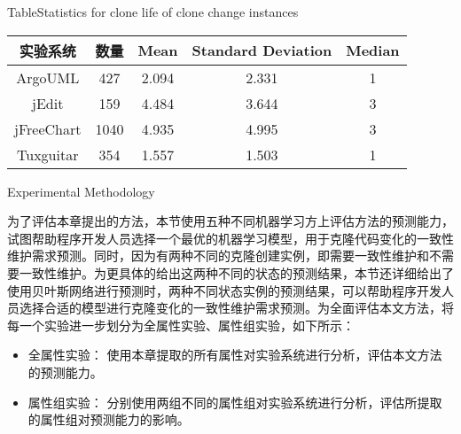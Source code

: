 \begin{table}[htbp]
{Table$\!$}{Statistics for clone life of clone change instances}
\vspace{0.5em}
\centering
\wuhao
\begin{tabular}{ccccc}
\toprule[1.5pt]
{实验系统}&{数量}&{Mean}&{Standard Deviation}&{Median}\\ 
\midrule[1pt]
ArgoUML&427&2.094&2.331&1\\ 
jEdit&159&4.484&3.644&3\\ 
jFreeChart&1040&4.935&4.995&3\\ 
Tuxguitar&354&1.557&1.503&1\\ 
\bottomrule[1.5pt]
\end{tabular}
\end{table}


{Experimental Methodology}

为了评估本章提出的方法，本节使用五种不同机器学习方上评估方法的预测能力，试图帮助程序开发人员选择一个最优的机器学习模型，用于克隆代码变化的一致性维护需求预测。同时，因为有两种不同的克隆创建实例，即需要一致性维护和不需要一致性维护。为更具体的给出这两种不同的状态的预测结果，本节还详细给出了使用贝叶斯网络进行预测时，两种不同状态实例的预测结果，可以帮助程序开发人员选择合适的模型进行克隆变化的一致性维护需求预测。为全面评估本文方法，将每一个实验进一步划分为全属性实验、属性组实验，如下所示：

\begin{itemize}
\item
全属性实验：
使用本章提取的所有属性对实验系统进行分析，评估本文方法的预测能力。
\item
属性组实验：
分别使用两组不同的属性组对实验系统进行分析，评估所提取的属性组对预测能力的影响。
\end{itemize}

